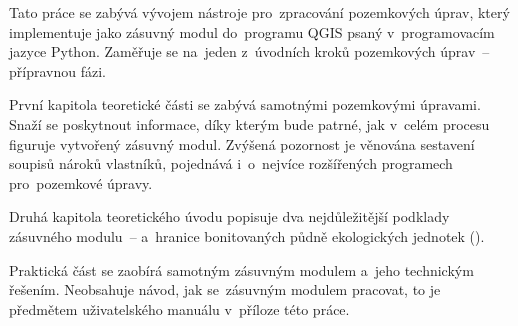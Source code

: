 Tato práce se zabývá vývojem nástroje pro~zpracování pozemkových
úprav, který implementuje jako zásuvný modul do~programu QGIS psaný
v~programovacím jazyce Python. Zaměřuje se na~jeden z~úvodních kroků
pozemkových úprav~– přípravnou fázi.

První kapitola teoretické části se zabývá samotnými pozemkovými
úpravami. Snaží se poskytnout informace, díky kterým bude patrné, jak
v~celém procesu figuruje vytvořený zásuvný modul. Zvýšená pozornost je
věnována sestavení soupisů nároků vlastníků, pojednává i~o~nejvíce
rozšířených programech pro~pozemkové úpravy.

Druhá kapitola teoretického úvodu popisuje dva nejdůležitější podklady
zásuvné\-ho modulu~–  a~hranice bonitovaných půdně
ekologických jednotek ().

Praktická část se zaobírá samotným zásuvným modulem a~jeho technickým
řešením. Neobsahuje návod, jak se~zásuvným modulem pracovat, to je
předmětem uživatelského manuálu v~příloze této práce.
